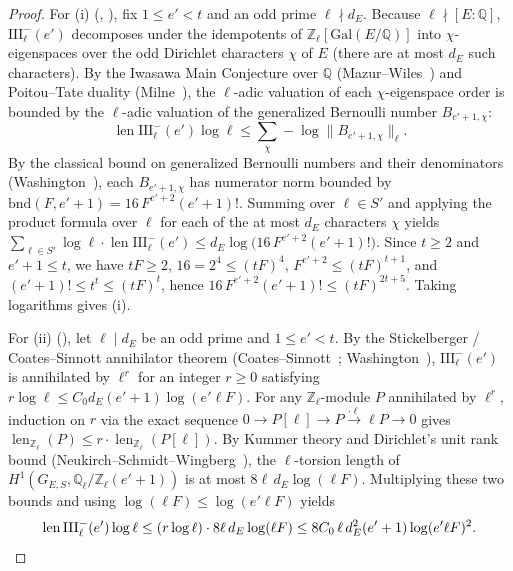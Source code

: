 \documentclass[11pt]{amsart}
\newcommand{\Z}{\mathbb{Z}}
\newcommand{\Q}{\mathbb{Q}}
\newcommand{\Sha}{\mathrm{III}}
\DeclareMathOperator{\len}{len}
\theoremstyle{plain}
\theoremstyle{definition}
\numberwithin{equation}{section}
\begin{document}
\begin{proof}
For (i) (, ), fix $1\le e'<t$ and an odd prime
$\ell\nmid d_E$. Because $\ell\nmid[E:\Q]$, $\Sha_\ell^-(e')$ decomposes under the idempotents of
$\Z_\ell[\mathrm{Gal}(E/\Q)]$ into $\chi$-eigenspaces over the odd Dirichlet characters $\chi$ of
$E$ (there are at most $d_E$ such characters). By the Iwasawa Main Conjecture over $\Q$
(Mazur--Wiles~\cite[Ch.~1, \S10, Main Theorem]{mazur-wiles}) and Poitou--Tate duality
(Milne~\cite[Ch.~I, Thm.~4.10]{milne}), the $\ell$-adic valuation of each $\chi$-eigenspace order
is bounded by the $\ell$-adic valuation of the generalized Bernoulli number $B_{e'+1,\chi}$:
\[
\len\Sha_\ell^-(e')\log\ell\le\sum_{\chi}-\log\|B_{e'+1,\chi}\|_\ell.
\]
By the classical bound on generalized Bernoulli numbers and their denominators
(Washington~\cite[Ch.~4, Prop.~4.1]{washington}), each $B_{e'+1,\chi}$ has numerator norm bounded
by $\mathrm{bnd}(F,e'+1)=16\,F^{e'+2}(e'+1)!$. Summing over $\ell\in S'$ and applying the product
formula over $\ell$ for each of the at most $d_E$ characters $\chi$ yields
$\sum_{\ell\in S'}\log\ell\cdot\len\Sha_\ell^-(e')\le d_E\log\bigl(16\,F^{e'+2}(e'+1)!\bigr)$.
Since $t\ge 2$ and $e'+1\le t$, we have $tF\ge 2$, $16=2^4\le(tF)^4$, $F^{e'+2}\le(tF)^{t+1}$, and
$(e'+1)!\le t^t\le(tF)^t$, hence $16\,F^{e'+2}(e'+1)!\le(tF)^{2t+5}$. Taking logarithms gives (i).

For (ii) (), let $\ell\mid d_E$ be an odd prime and $1\le e'<t$. By the
Stickelberger / Coates--Sinnott annihilator theorem
(Coates--Sinnott~\cite[Thm.~1.3]{coates-sinnott}; Washington~\cite[Ch.~6, Thm.~6.10]{washington}),
$\Sha_\ell^-(e')$ is annihilated by $\ell^r$ for an integer $r\ge 0$ satisfying
$r\log\ell\le C_0 d_E(e'+1)\log(e'\ell F)$. For any $\Z_\ell$-module $P$ annihilated by $\ell^r$,
induction on $r$ via the exact sequence $0\to P[\ell]\to P\xrightarrow{\cdot\ell}\ell P\to 0$
gives $\len_{\Z_\ell}(P)\le r\cdot\len_{\Z_\ell}(P[\ell])$. By Kummer theory and Dirichlet's unit
rank bound (Neukirch--Schmidt--Wingberg~\cite[Ch.~VIII, Thm.~8.7.4]{nsw}), the $\ell$-torsion
length of $H^1(G_{E,S},\Q_\ell/\Z_\ell(e'+1))$ is at most $8\ell\,d_E\log(\ell F)$. Multiplying
these two bounds and using $\log(\ell F)\le\log(e'\ell F)$ yields
\[
\len\Sha_\ell^-(e')\log\ell\le (r\log\ell)\cdot 8\ell\,d_E\log(\ell F)
\le 8C_0\,\ell\,d_E^2(e'+1)\log(e'\ell F)^2. \qedhere
\]
\end{proof}
\end{document}
